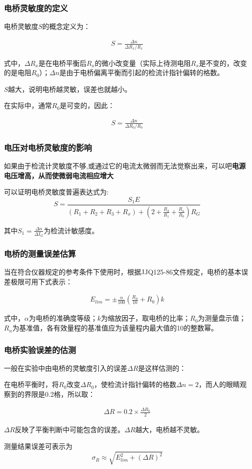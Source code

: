 \documentclass{beamer}
\begin{document}
	\begin{frame}
		\frametitle{电桥灵敏度的定义}
		
		电桥灵敏度$S$的概念定义为：
		
		\begin{align}
			S = \frac{\Delta n}{\Delta R_x/R_x}
		\end{align}
		
		式中，$\Delta R_x$是在电桥平衡后$R_x$的微小改变量（实际上待测电阻$R_x$是不变的，改变的是电阻$R_0$）；$\Delta n$是由于电桥偏离平衡而引起的检流计指针偏转的格数。
		
		$S$越大，说明电桥越灵敏，误差也就越小。
		
		在实际中，通常$R_0$是可变的，因此：
		
		\begin{align}
			S = \frac{\Delta n}{\Delta R_0/R_0}
		\end{align}
		
	\end{frame}
    \begin{frame}
		\frametitle{电压对电桥灵敏度的影响}
         
		如果由于检流计灵敏度不够,或通过它的电流太微弱而无法觉察出来，可以吧\textbf{电源电压增高，从而使微弱电流相应增大}

		可以证明电桥灵敏度普遍表达式为:
		$$
		S=\frac{S_1E}{(R_1+R_2+R_3+R_x)+(2+\frac{R_2}{R_1}+\frac{R_x}{R_0})R_G}
		$$

		其中$S_1=\frac{\Delta n}{\Delta I_G}$为检流计敏感度。
	\end{frame}
	\begin{frame}
		\frametitle{电桥的测量误差估算}
		
		当在符合仪器规定的参考条件下使用时，根据JJQ125-86文件规定，电桥的基本误差极限可用下式表示：
		
		\begin{align}
			E_{lim} = \pm\frac{\alpha}{100}(\frac{R_n}{10} + R_0)k
		\end{align}
		
		式中，$\alpha$为电桥的准确度等级；$k$为缩放因子，取电桥的比率；$R_0$为测量盘示值；$R_n$为基准值，各有效量程的基准值应为该量程内最大值的10的整数幂。
		
	\end{frame}

	\begin{frame}
		\frametitle{电桥实验误差的估测}
		
		一般在实验中由电桥的灵敏度引入的误差$\Delta R$是这样估测的：
		
		在电桥平衡时，将$R_0$改变$\Delta R_0$，使检流计指针偏转的格数$\Delta n = 2$，而人的眼睛观察到的界限是0.2格，所以取：
		
		\begin{align}
			\Delta R = 0.2 \times \frac{\Delta R_0}{2}
		\end{align}
		
		$\Delta R$反映了平衡判断中可能包含的误差。$\Delta R$越大，电桥越不灵敏。
		
		测量结果误差可表示为
		$$
		\sigma_R \approx \sqrt{E_{lim}^2+(\Delta R)^2}
		$$
	\end{frame}
\end{document}
